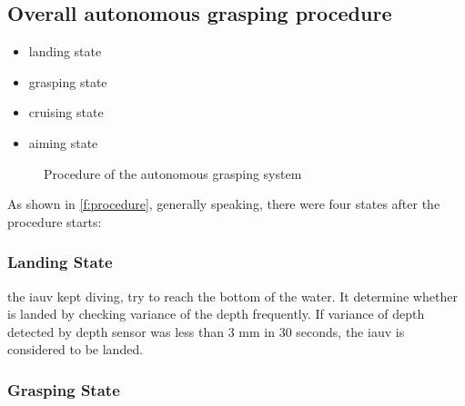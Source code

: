 

\subsection{Overall autonomous grasping procedure}

\begin{itemize}
    \item landing state
    \item grasping state
    \item cruising state
    \item aiming state
\end{itemize}

\begin{figure}[htb]
    \def\svgwidth{\columnwidth}
    \caption[Procedure of the Autonomous Grasping System]{Procedure of the
        autonomous grasping system}\label{f:procedure}
\end{figure}

As shown in \autoref{f:procedure}, generally speaking, there were four states
after the procedure starts:

\subsubsection{Landing State}

the \gls{iauv} kept diving, try to reach the bottom of the water. It determine
whether is landed by checking variance of the depth frequently. If variance of
depth detected by depth sensor was less than 3 mm in 30 seconds, the \gls{iauv}
is considered to be landed.

\subsubsection{Grasping State}

